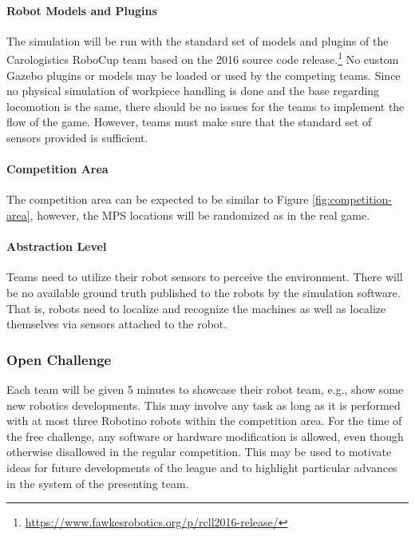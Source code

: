 \documentclass[12pt,twoside]{article}
\begin{document}
\vspace{-2ex}\paragraph{Robot Models and Plugins}
%
The simulation will be run with the standard set of models and plugins
of the Carologistics RoboCup team based on the 2016 source code
release.\footnote{\url{https://www.fawkesrobotics.org/p/rcll2016-release/}} No
custom Gazebo plugins or models may be loaded or used by the competing
teams. Since no physical simulation of workpiece handling is done and
the base regarding locomotion is the same, there should be no
issues for the teams to implement the flow of the game. However, teams must
make sure that the standard set of sensors
provided is sufficient.

\vspace{-2ex}\paragraph{Competition Area} The competition area can be
expected to be similar to Figure \ref{fig:competition-area}, however,
the MPS locations will be randomized as in the real game.

\vspace{-2ex}\paragraph{Abstraction Level} Teams need to utilize their
robot sensors to perceive the environment. There will be no available
ground truth published to the robots by the simulation software. That
is, robots need to localize and recognize the machines as well as
localize themselves via sensors attached to the robot.


\subsubsection{Open Challenge~}
Each team will be given 5 minutes to showcase their robot team, e.g.,
show some new robotics developments. This may involve any task as long
as it is performed with at most three Robotino robots within the
competition area. For the time of the free challenge, any software or
hardware modification is allowed, even though otherwise disallowed in
the regular competition. This may be used to motivate ideas for future
developments of the league and to highlight particular advances in the
system of the presenting team.
\end{document}

